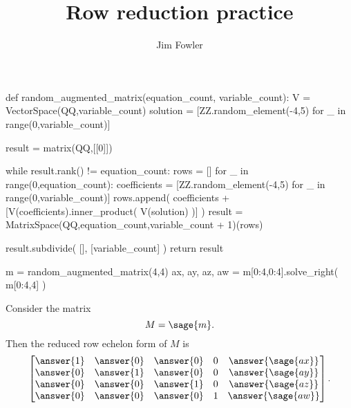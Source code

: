 \documentclass{ximera}
\title{Row reduction practice}
\author{Jim Fowler}
\begin{document}
\begin{sagesilent}
def random_augmented_matrix(equation_count, variable_count):
    V = VectorSpace(QQ,variable_count)
    solution = [ZZ.random_element(-4,5) for _ in range(0,variable_count)]

    result = matrix(QQ,[[0]])

    while result.rank() != equation_count:
        rows = []
        for _ in range(0,equation_count):
            coefficients = [ZZ.random_element(-4,5) for _ in range(0,variable_count)]        
            rows.append( coefficients + [V(coefficients).inner_product( V(solution) )] )
        result = MatrixSpace(QQ,equation_count,variable_count + 1)(rows)

    result.subdivide( [], [variable_count] )
    return result

m = random_augmented_matrix(4,4)
ax, ay, az, aw = m[0:4,0:4].solve_right( m[0:4,4] )
\end{sagesilent}

\begin{problem}
  Consider the matrix
  \[
    M = \sage{m}.
  \]
  Then the reduced row echelon form of $M$ is
  \[
    \begin{bmatrix}
      \answer{1} & \answer{0} & \answer{0} & 0 & \answer{\sage{ax}} \\
      \answer{0} & \answer{1} & \answer{0} & 0 & \answer{\sage{ay}} \\
      \answer{0} & \answer{0} & \answer{1} & 0 & \answer{\sage{az}} \\
      \answer{0} & \answer{0} & \answer{0} & 1 & \answer{\sage{aw}}
    \end{bmatrix}.
  \]
\end{problem}
\end{document}
